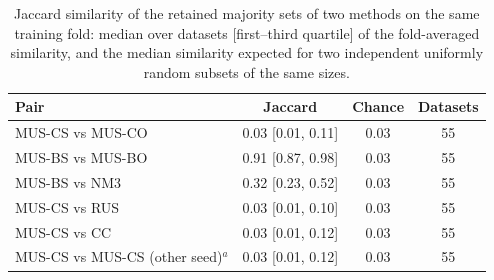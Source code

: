 \begin{table}[t]
\centering
\footnotesize
\caption{Jaccard similarity of the retained majority sets of two methods on the same training fold: median over datasets [first--third quartile] of the fold-averaged similarity, and the median similarity expected for two independent uniformly random subsets of the same sizes.}
\label{tab:overlap}
\begin{tabular}{lccc}
\toprule
Pair & Jaccard & Chance & Datasets \\
\midrule
MUS-CS vs MUS-CO & 0.03 [0.01, 0.11] & 0.03 & 55 \\
MUS-BS vs MUS-BO & 0.91 [0.87, 0.98] & 0.03 & 55 \\
MUS-BS vs NM3 & 0.32 [0.23, 0.52] & 0.03 & 55 \\
MUS-CS vs RUS & 0.03 [0.01, 0.10] & 0.03 & 55 \\
MUS-CS vs CC & 0.03 [0.01, 0.12] & 0.03 & 55 \\
MUS-CS vs MUS-CS (other seed)$^{a}$ & 0.03 [0.01, 0.12] & 0.03 & 55 \\
\bottomrule
\end{tabular}
\par{}
\end{table}
